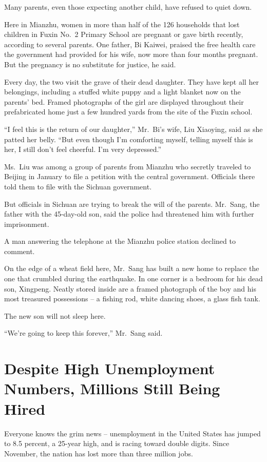 \documentclass[12pt,a4paper,onecolumn]{article}
\begin{document}
Many parents, even those expecting another child, have refused to quiet down.

Here in Mianzhu, women in more than half of the 126 households that lost children in Fuxin No.~2
Primary School are pregnant or gave birth recently, according to several parents. One father, Bi
Kaiwei, praised the free health care the government had provided for his wife, now more than four
months pregnant. But the pregnancy is no substitute for justice, he said.

Every day, the two visit the grave of their dead daughter. They have kept all her belongings,
including a stuffed white puppy and a light blanket now on the parents' bed. Framed photographs of
the girl are displayed throughout their prefabricated home just a few hundred yards from the site of
the Fuxin school.

``I feel this is the return of our daughter,'' Mr.~Bi's wife, Liu Xiaoying, said as she patted her
belly. ``But even though I'm comforting myself, telling myself this is her, I still don't feel
cheerful. I'm very depressed.''

Ms.~Liu was among a group of parents from Mianzhu who secretly traveled to Beijing in January to
file a petition with the central government. Officials there told them to file with the Sichuan
government.

But officials in Sichuan are trying to break the will of the parents. Mr.~Sang, the father with the
45-day-old son, said the police had threatened him with further imprisonment.

A man answering the telephone at the Mianzhu police station declined to comment.

On the edge of a wheat field here, Mr.~Sang has built a new home to replace the one that crumbled
during the earthquake. In one corner is a bedroom for his dead son, Xingpeng. Neatly stored inside
are a framed photograph of the boy and his most treasured possessions -- a fishing rod, white
dancing shoes, a glass fish tank.

The new son will not sleep here.

``We're going to keep this forever,'' Mr.~Sang said.

\section{Despite High Unemployment Numbers, Millions Still Being Hired}

Everyone knows the grim news -- unemployment in the United States has jumped to 8.5 percent, a
25-year high, and is racing toward double digits. Since November, the nation has lost more than
three million jobs.
\end{document}
